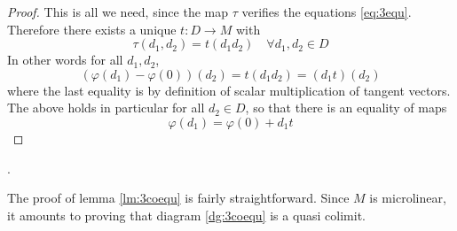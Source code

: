 \begin{proof}
  This is all we need, since the map \( \tau \) verifies the equations \ref{eq:3equ}. Therefore there exists a unique \( t:D\to M \) with
  \begin{equation*}
    \tau(d_1,d_2)=t(d_1d_2) \quad \forall d_1,d_2\in D
  \end{equation*}
  In other words for all \( d_1,d_2 \),
  \begin{equation*}
    (\varphi(d_1) - \varphi(0))(d_2) = t(d_1d_2) = (d_1t)(d_2)
  \end{equation*}
  where the last equality is by definition of scalar multiplication of tangent vectors. The above holds in particular for all \( d_2\in D \), so that there is an equality of maps
  \begin{equation*}
    \varphi(d_1) = \varphi(0)+d_1t
  \end{equation*}
\end{proof}.

The proof of lemma \ref{lm:3coequ} is fairly straightforward. Since \( M \) is microlinear, it amounts to proving that diagram \ref{dg:3coequ} is a quasi colimit.


